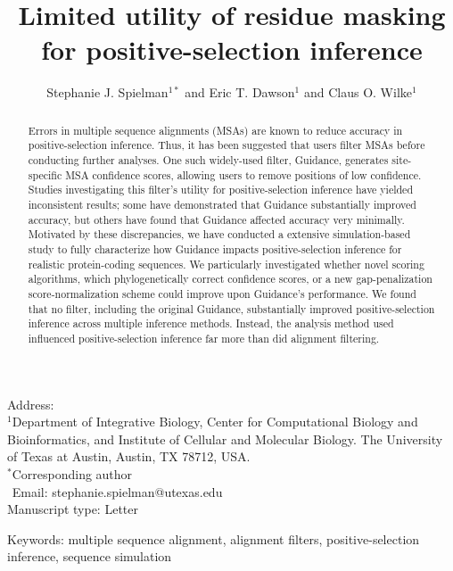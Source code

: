 \documentclass[11pt]{article}
\begin{document}
\title{\textbf{Limited utility of residue masking for positive-selection inference}}
\author{Stephanie J. Spielman$^{1*}$ and Eric T. Dawson$^{1}$ and Claus O. Wilke$^{1}$}
\date{}

\maketitle
\noindent
Address:\\
$^1$Department of Integrative Biology, Center for Computational Biology and Bioinformatics, and Institute of Cellular and Molecular Biology.
The University of Texas at Austin, Austin, TX 78712, USA.\\

\bigskip
\noindent
$^*$Corresponding author\\
$\phantom{^*}$Email: stephanie.spielman@utexas.edu\\

\bigskip
\noindent
Manuscript type: Letter

\bigskip
\noindent Keywords: multiple sequence alignment, alignment filters, positive-selection inference, sequence simulation

\newpage
\begin{abstract}
Errors in multiple sequence alignments (MSAs) are known to reduce accuracy in positive-selection inference. Thus, it has been suggested that users filter MSAs before conducting further analyses. One such widely-used filter, Guidance, generates site-specific MSA confidence scores, allowing users to remove positions of low confidence. Studies investigating this filter's utility for positive-selection inference have yielded inconsistent results; some have demonstrated that Guidance substantially improved accuracy, but others have found that Guidance affected accuracy very minimally. Motivated by these discrepancies, we have conducted a extensive simulation-based study to fully characterize how Guidance impacts positive-selection inference for realistic protein-coding sequences. We particularly investigated whether novel scoring algorithms, which phylogenetically correct confidence scores, or a new gap-penalization score-normalization scheme could improve upon Guidance's performance. We found that no filter, including the original Guidance, substantially improved positive-selection inference across multiple inference methods. Instead, the analysis method used influenced positive-selection inference far more than did alignment filtering.
\end{abstract}
\end{document}

